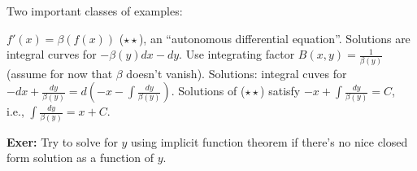 \documentclass[10pt,letterpaper]{article}
\newcommand{\n}{\hfill\break}
\newcommand{\exer}[1]{\par\noindent\settowidth{\hangindent}{\textbf{Exer: }}\textbf{Exer: }#1\n}
\begin{document}
\par\noindent Two important classes of examples:\n

\par{} $f'(x)=\beta(f(x))$ ($\star\star$), an ``autonomous differential equation''. Solutions are integral curves for\n
$-\beta(y)dx-dy$. Use integrating factor $B(x,y)=\frac{1}{\beta(y)}$ (assume for now that $\beta$ doesn't vanish).\n
Solutions: integral cuves for $-dx+\frac{dy}{\beta(y)}=d(-x-\int\frac{dy}{\beta(y)})$.\n
Solutions of ($\star\star$) satisfy $-x+\int\frac{dy}{\beta(y)}=C$, i.e., $\int\frac{dy}{\beta(y)}=x+C$.\n

\exer{Try to solve for $y$ using implicit function theorem if there's no nice closed form solution as a function of $y$.}
\end{document}
